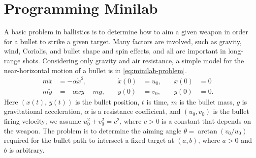 \documentclass[12pt]{article}
\begin{document}
\section{Programming Minilab}
A basic problem in ballistics is to determine how to aim a given weapon in order
for a bullet to strike a given target. Many factors are involved, such as
gravity, wind, Coriolis, and bullet shape and spin effects, and all are
important in long-range shots. Considering only gravity and air resistance, a
simple model for the near-horizontal motion of a bullet is in
\cref{eq:minilab-problem}.
\begin{equation}
  \label{eq:minilab-problem}
  \begin{aligned}
    m\ddot{x}&=-\alpha\dot{x}^2, &\quad \dot{x}(0)&=u_0, &\quad x(0)&=0 \\
    m\ddot{y}&=-\alpha\dot{x}\dot{y}-mg, &\quad \dot{y}(0)&=v_0, &\quad y(0)&=0.
  \end{aligned}
\end{equation}
Here $(x(t),\,y(t))$ is the bullet position, $t$ is time, $m$ is the bullet
mass, $g$ is gravitational acceleration, $\alpha$ is a resistance coefficient,
and $(u_0,v_0)$ is the bullet firing velocity; we assume $u_0^2+v_0^2=c^2$,
where $c>0$ is a constant that depends on the weapon. The problem is to
determine the aiming angle $\theta = \arctan(v_0/u_0)$ required for the bullet
path to intersect a fixed target at $(a,b)$, where $a>0$ and $b$ is arbitrary.
\end{document}
